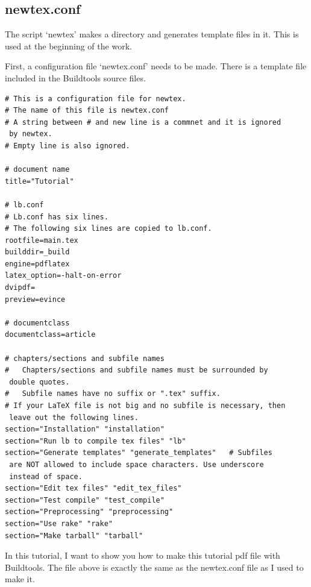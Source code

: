 \subsection{newtex.conf}
The script `newtex' makes a directory and generates template files in it.
This is used at the beginning of the work.

First, a configuration file `newtex.conf' needs to be made.
There is a template file included in the Buildtools source files.
\begin{verbatim}
# This is a configuration file for newtex.
# The name of this file is newtex.conf
# A string between # and new line is a commnet and it is ignored
 by newtex.
# Empty line is also ignored. 

# document name
title="Tutorial"

# lb.conf
# Lb.conf has six lines.
# The following six lines are copied to lb.conf.
rootfile=main.tex
builddir=_build
engine=pdflatex
latex_option=-halt-on-error
dvipdf=
preview=evince

# documentclass
documentclass=article

# chapters/sections and subfile names
#   Chapters/sections and subfile names must be surrounded by
 double quotes.
#   Subfile names have no suffix or ".tex" suffix.
# If your LaTeX file is not big and no subfile is necessary, then
 leave out the following lines.
section="Installation" "installation"
section="Run lb to compile tex files" "lb"
section="Generate templates" "generate_templates"   # Subfiles
 are NOT allowed to include space characters. Use underscore
 instead of space. 
section="Edit tex files" "edit_tex_files"
section="Test compile" "test_compile"
section="Preprocessing" "preprocessing"
section="Use rake" "rake"
section="Make tarball" "tarball"

\end{verbatim}
In this tutorial, I want to show you how to make this tutorial pdf file with Buildtools.
The file above is exactly the same as the newtex.conf file as I used to make it.

